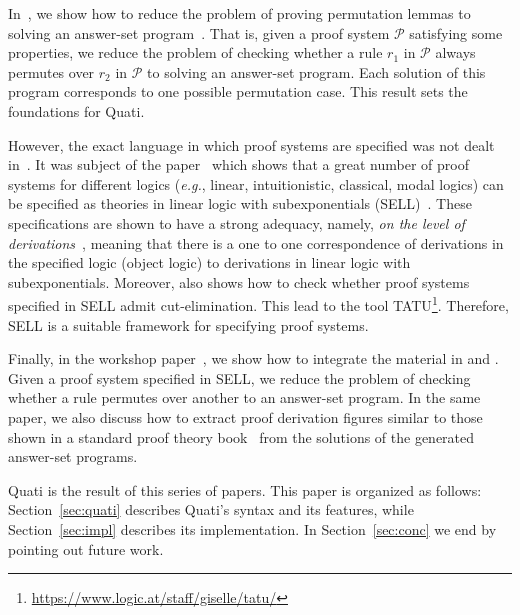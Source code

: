 \documentclass{llncs}
\newcommand\Pscr{\mathcal{P}}
\newcommand{\eg}{{\em e.g.}}
\begin{document}
In~\cite{nigam13iclp}, we show how to reduce the problem of proving permutation
lemmas to solving an answer-set program~\cite{gelfond90iclp}. That is, given a proof
system $\Pscr$ satisfying some properties, we reduce the problem 
of checking whether a rule $r_1$ in $\Pscr$ always permutes over $r_2$ in
$\Pscr$ to solving an answer-set program. Each solution of this program
corresponds to one possible permutation case. This result sets the foundations 
for Quati.

However, the exact language in which proof systems are specified was not dealt
in~\cite{nigam13iclp}. It was subject of the paper~\cite{nigam.jlc} which
shows that a great number of proof systems for different logics (\eg, linear,
intuitionistic, classical, modal logics) can be specified as theories in linear
logic with subexponentials (SELL)~\cite{nigam09ppdp}. These specifications are shown to
have a strong adequacy, namely, \emph{on the level of
derivations}~\cite{nigam10jar}, meaning that there is a one to one
correspondence of derivations in the specified logic (object logic) to derivations in linear
logic with subexponentials. Moreover, \cite{nigam.jlc} also shows how to check whether 
proof systems specified in SELL admit cut-elimination. This lead to the tool 
TATU\footnote{\url{https://www.logic.at/staff/giselle/tatu/}}. Therefore, SELL is
a suitable framework for specifying proof systems. 

Finally, in the workshop paper~\cite{nigam14ebl}, we show how to integrate the material
in \cite{nigam13iclp} and \cite{nigam.jlc}. Given a proof system specified in
SELL, we reduce the problem of checking whether a rule permutes over another to
an answer-set program.
In the same paper, we also discuss how to extract
proof derivation figures similar to those shown in a standard proof theory
book~\cite{troelstra96bpt} from the solutions of the generated answer-set programs. 

Quati is the result of this series of papers. This paper is organized as follows: Section~\ref{sec:quati} describes
Quati's syntax and its features, while Section~\ref{sec:impl} describes its implementation.
In Section~\ref{sec:conc} we end by pointing out future work.

\vspace{-4mm}
\end{document}
